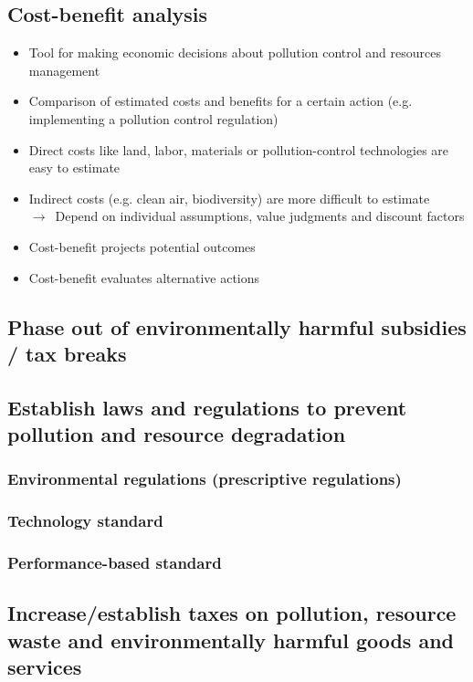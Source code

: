\documentclass{article}
\begin{document}
\subsection{Cost-benefit analysis}
\begin{itemize}
    \item Tool for making economic decisions about pollution control and resources management
    \item Comparison of estimated costs and benefits for a certain action (e.g. implementing a pollution control regulation)
    \item Direct costs like land, labor, materials or pollution-control technologies are easy to estimate
    \item Indirect costs (e.g. clean air, biodiversity) are more difficult to estimate\\
        $\to$\ Depend on individual assumptions, value judgments and discount factors
    \item Cost-benefit projects potential outcomes
    \item Cost-benefit evaluates alternative actions
\end{itemize}

\subsection{Phase out of environmentally harmful subsidies / tax breaks}
\todo

\subsection{Establish laws and regulations to prevent pollution and resource degradation}
\subsubsection{Environmental regulations (prescriptive regulations)}
\subsubsection{Technology standard}
\subsubsection{Performance-based standard}

\subsection{Increase/establish taxes on pollution, resource waste and environmentally harmful goods and services}
\end{document}
